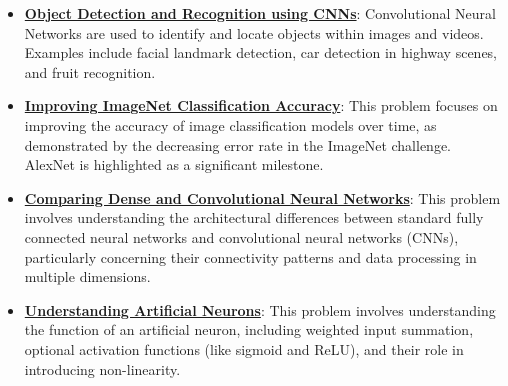 \documentclass{article}%
\begin{document}
\begin{itemize}[leftmargin=*]%
\item \href{https://purdue.brightspace.com/d2l/common/assets/pdfjs-d2l-dist/1.0.14-legacy/web/viewer.html?file=\%2Fcontent\%2Fenforced\%2F1095467-wl.202510.CS.24300.001\%2F09L1-cnn.pdf\%3Fou\%3D1095467\&lang=en-us\&container=d2l-fileviewer-rendered-pdf\&fullscreen=d2l-fileviewer-rendered-pdf-dialog\&height=667#page=2}{\textbf{Object Detection and Recognition using CNNs}}: Convolutional Neural Networks are used to identify and locate objects within images and videos. Examples include facial landmark detection, car detection in highway scenes, and fruit recognition.%
\item \href{https://purdue.brightspace.com/d2l/common/assets/pdfjs-d2l-dist/1.0.14-legacy/web/viewer.html?file=\%2Fcontent\%2Fenforced\%2F1095467-wl.202510.CS.24300.001\%2F09L1-cnn.pdf\%3Fou\%3D1095467\&lang=en-us\&container=d2l-fileviewer-rendered-pdf\&fullscreen=d2l-fileviewer-rendered-pdf-dialog\&height=667#page=3}{\textbf{Improving ImageNet Classification Accuracy}}: This problem focuses on improving the accuracy of image classification models over time, as demonstrated by the decreasing error rate in the ImageNet challenge. AlexNet is highlighted as a significant milestone.%
\item \href{https://purdue.brightspace.com/d2l/common/assets/pdfjs-d2l-dist/1.0.14-legacy/web/viewer.html?file=\%2Fcontent\%2Fenforced\%2F1095467-wl.202510.CS.24300.001\%2F09L1-cnn.pdf\%3Fou\%3D1095467\&lang=en-us\&container=d2l-fileviewer-rendered-pdf\&fullscreen=d2l-fileviewer-rendered-pdf-dialog\&height=667#page=4}{\textbf{Comparing Dense and Convolutional Neural Networks}}: This problem involves understanding the architectural differences between standard fully connected neural networks and convolutional neural networks (CNNs), particularly concerning their connectivity patterns and data processing in multiple dimensions.%
\item \href{https://purdue.brightspace.com/d2l/common/assets/pdfjs-d2l-dist/1.0.14-legacy/web/viewer.html?file=\%2Fcontent\%2Fenforced\%2F1095467-wl.202510.CS.24300.001\%2F09L1-cnn.pdf\%3Fou\%3D1095467\&lang=en-us\&container=d2l-fileviewer-rendered-pdf\&fullscreen=d2l-fileviewer-rendered-pdf-dialog\&height=667#page=5}{\textbf{Understanding Artificial Neurons}}: This problem involves understanding the function of an artificial neuron, including weighted input summation, optional activation functions (like sigmoid and ReLU), and their role in introducing non-linearity.%

\end{itemize}
\end{document}
